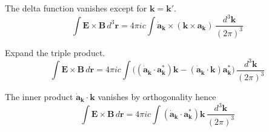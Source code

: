 The delta function vanishes except for $\mathbf k=\mathbf k'$.
\begin{equation*}
\int\mathbf E\times\mathbf B\,d^3\mathbf r
=4\pi ic\int\dot{\mathbf a}_{\mathbf k}\times(\mathbf k\times\mathbf a_{\mathbf k})
\,\frac{d^3\mathbf k}{(2\pi)^3}
\end{equation*}

Expand the triple product.
\begin{equation*}
\int\mathbf E\times\mathbf B\,d\mathbf r
=4\pi ic\int
\bigl((\dot{\mathbf a}_{\mathbf k}\cdot\mathbf a_{\mathbf k}^*)\mathbf k
-(\dot{\mathbf a}_{\mathbf k}\cdot\mathbf k)\mathbf a_{\mathbf k}^*\bigr)
\,\frac{d^3\mathbf k}{(2\pi)^3}
\end{equation*}

The inner product $\dot{\mathbf a}_{\mathbf k}\cdot\mathbf k$ vanishes by orthogonality hence
\begin{equation*}
\int\mathbf E\times\mathbf B\,d\mathbf r
=4\pi ic\int
(\dot{\mathbf a}_{\mathbf k}\cdot\mathbf a_{\mathbf k}^*)\mathbf k
\,\frac{d^3\mathbf k}{(2\pi)^3}
\end{equation*}


